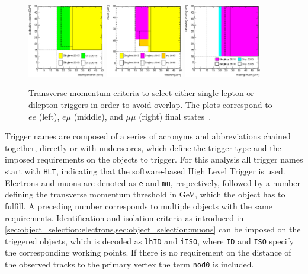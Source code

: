 \begin{figure}[htb]
    \centering
        \includegraphics[width=0.3\textwidth]{./figures/event_selection/triggers_ee.eps}
        \includegraphics[width=0.3\textwidth]{./figures/event_selection/triggers_emu.eps}
        \includegraphics[width=0.3\textwidth]{./figures/event_selection/triggers_mumu.eps}
        \caption{Transverse momentum criteria to select either single-lepton or dilepton triggers in order to avoid overlap.
        The plots correspond to $ee$ (left), $e\mu$ (middle), and $\mu\mu$ (right) final states~\cite{TauConfNote}.}\label{fig:event_selection:triggers}
\end{figure}

Trigger names are composed of a series of acronyms and abbreviations chained together, directly or with underscores,
which define the trigger type and the imposed requirements on the objects to trigger.
For this analysis all trigger names start with \texttt{HLT}, indicating that the software-based High Level Trigger
is used.
Electrons and muons are denoted  as \texttt{e} and \texttt{mu}, respectively, followed by a number defining the transverse
momentum threshold in GeV, which the object has to fulfill.
A preceding number corresponds to multiple objects with the same requirements.
Identification and isolation criteria as introduced in \cref{sec:object_selection:electrons,sec:object_selection:muons}
can be imposed on the triggered objects, which is decoded as \texttt{lhID}
and \texttt{iISO}, where \texttt{ID} and \texttt{ISO} specify the corresponding working points.
If there is no requirement on the distance of the observed tracks to the primary vertex the term \texttt{nod0}
is included.

